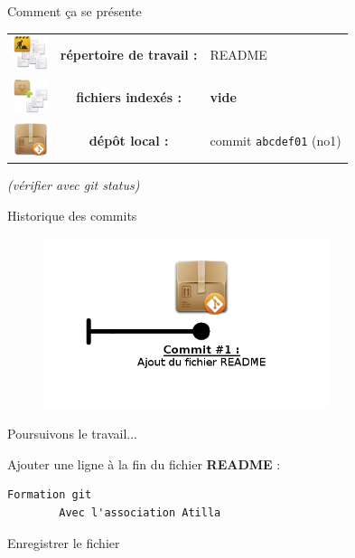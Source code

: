 \documentclass{beamer}
\begin{document}
\begin{frame}{Comment ça se présente}
	\begin{center}
		\begin{tabular}{l c l}
		\includegraphics[width=1cm]{img/working_dir} & \textbf{répertoire de travail :} & README \\
		\includegraphics[width=1cm]{img/stash} & \textbf{fichiers indexés :} & \textbf{vide}\\
		\includegraphics[width=1cm]{img/git_repo} & \textbf{dépôt local :} & commit \texttt{abcdef01} (no1) \\ 
		\end{tabular} 
	\end{center}

	\begin{center}
		\textit{(vérifier avec git status)}
	\end{center}
\end{frame}

\begin{frame}{Historique des commits}

	\begin{figure}
		\centering
		\includegraphics[height=5cm]{img/repo2}
	\end{figure}
\end{frame}

\begin{frame}[fragile]{Poursuivons le travail...}

	Ajouter une ligne à la fin du fichier \textbf{README} :
	\begin{lstlisting}[frame=single]
		Formation git
		Avec l'association Atilla
	\end{lstlisting}
	Enregistrer le fichier
\end{frame}
\end{document}
